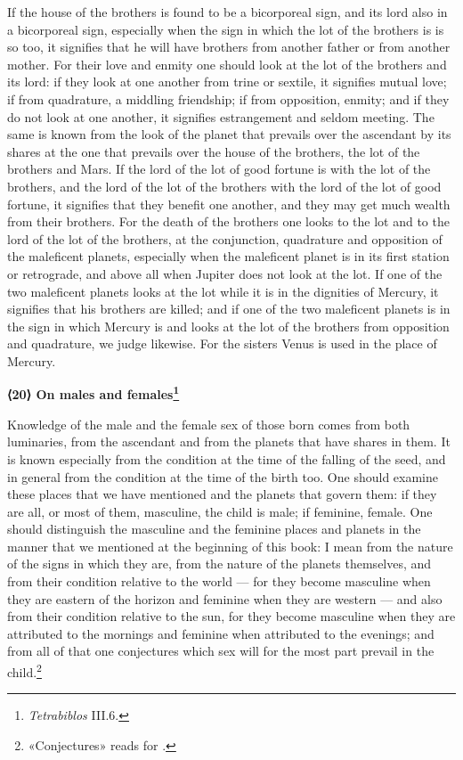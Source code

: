 \documentclass[11pt]{article}
\newcommand{\Fol}[1]{\marginpar{\footnotesize\color{gray}f.\,#1}}
\newcommand{\ChapterHead}[4]{\par\needspace{8\baselineskip}\bigskip\pdfbookmark[1]{#1}{ch-#2}\hypertarget{EN-K#2}{}%
 {\large\bfseries\interlinepenalty=10000 #1#4{\normalfont\normalsize#3}\par}\nobreak\medskip}
\begin{document}
\par \Fol{41r}If the house of the brothers is found to be a bicorporeal sign, and its lord also in a bicorporeal sign, especially when the sign in which the lot of the brothers is is so too, it signifies that he will have brothers from another father or from another mother. For their love and enmity one should look at the lot of the brothers and its lord: if they look at one another from trine or sextile, it signifies mutual love; if from quadrature, a middling friendship; if from opposition, enmity; and if they do not look at one another, it signifies estrangement and seldom meeting. The same is known from the look of the planet that prevails over the ascendant by its shares at the one that prevails over the house of the brothers, the lot of the brothers and Mars. If the lord of the lot of good fortune is with the lot of the brothers, and the lord of the lot of the brothers with the lord of the lot of good fortune, it signifies that they benefit one another, and they may get much wealth from their brothers. For the death of the brothers one looks to the lot and to the lord of the lot of the brothers, at the conjunction, quadrature and opposition of the maleficent planets, especially when the maleficent planet is in its first station or retrograde, and above all when Jupiter does not look at the lot. If one of the two maleficent planets looks at the lot while it is in the dignities of Mercury, it signifies that his brothers are killed; and if one of the two maleficent planets is in the sign in which Mercury is and looks at the lot of the brothers from opposition and quadrature, we judge likewise. For the sisters Venus is used in the place of Mercury.\par
\ChapterHead{{\mdseries ⟨}20{\mdseries ⟩} On males and females}{20}{}{\footnote{\emph{Tetrabiblos} III.6.}}
\par Knowledge of the male and the female sex of those born comes from both luminaries, from the ascendant and from the planets that have shares in them. It is known especially from the condition at the time of the falling of the seed, and in general from the condition at the time of the birth too. One should examine these places that we have mentioned and the planets that govern them: if they are all, or most of them, masculine, the child is male; if feminine, female. One should distinguish the masculine and the feminine places and planets in the manner that we mentioned at the beginning of this book: I mean from the nature of the signs in which they are, from the nature of the planets themselves, and from their condition relative to the world — for they become masculine when they are eastern of the horizon and feminine when they are western — and also from their condition relative to the sun, for they become masculine when they are attributed to the mornings and feminine when attributed to the evenings; and from all of that one conjectures which sex will for the most part prevail in the child.\footnote{«Conjectures» reads  for .}\par
\end{document}
